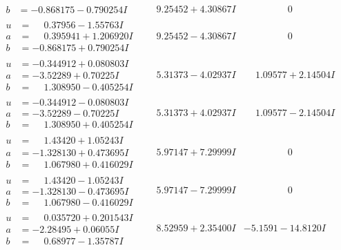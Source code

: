 \documentclass[1p]{elsarticle_modified}
\theoremstyle{definition}
\begin{document}
$$\begin{array}{c|c|c}
\begin{aligned}
b &= -0.868175 - 0.790254 I\end{aligned}
 & \phantom{-}9.25452 + 4.30867 I & \phantom{-0.000000 } 0 \\ \hline\begin{aligned}
u &= \phantom{-}0.37956 - 1.55763 I \\
a &= \phantom{-}0.395941 + 1.206920 I \\
b &= -0.868175 + 0.790254 I\end{aligned}
 & \phantom{-}9.25452 - 4.30867 I & \phantom{-0.000000 } 0 \\ \hline\begin{aligned}
u &= -0.344912 + 0.080803 I \\
a &= -3.52289 + 0.70225 I \\
b &= \phantom{-}1.308950 - 0.405254 I\end{aligned}
 & \phantom{-}5.31373 - 4.02937 I & \phantom{-}1.09577 + 2.14504 I \\ \hline\begin{aligned}
u &= -0.344912 - 0.080803 I \\
a &= -3.52289 - 0.70225 I \\
b &= \phantom{-}1.308950 + 0.405254 I\end{aligned}
 & \phantom{-}5.31373 + 4.02937 I & \phantom{-}1.09577 - 2.14504 I \\ \hline\begin{aligned}
u &= \phantom{-}1.43420 + 1.05243 I \\
a &= -1.328130 + 0.473695 I \\
b &= \phantom{-}1.067980 + 0.416029 I\end{aligned}
 & \phantom{-}5.97147 + 7.29999 I & \phantom{-0.000000 } 0 \\ \hline\begin{aligned}
u &= \phantom{-}1.43420 - 1.05243 I \\
a &= -1.328130 - 0.473695 I \\
b &= \phantom{-}1.067980 - 0.416029 I\end{aligned}
 & \phantom{-}5.97147 - 7.29999 I & \phantom{-0.000000 } 0 \\ \hline\begin{aligned}
u &= \phantom{-}0.035720 + 0.201543 I \\
a &= -2.28495 + 0.06055 I \\
b &= \phantom{-}0.68977 - 1.35787 I\end{aligned}
 & \phantom{-}8.52959 + 2.35400 I & -5.1591 - 14.8120 I \\ \hline\begin{aligned}

\end{aligned}
\end{array}$$
\end{document}
